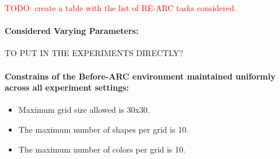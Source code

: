 \textcolor{red}{TODO: create a table with the list of RE-ARC tasks considered.}

\paragraph{Considered Varying Parameters:} TO PUT IN THE EXPERIMENTS DIRECTLY? 

\paragraph{Constrains of the Before-ARC environment maintained uniformly across all experiment settings:}
\begin{itemize}
    \item Maximum grid size allowed is 30x30. 
    \item The maximum number of shapes per grid is 10.
    \item The maximum number of colors per grid is 10. 
\end{itemize}